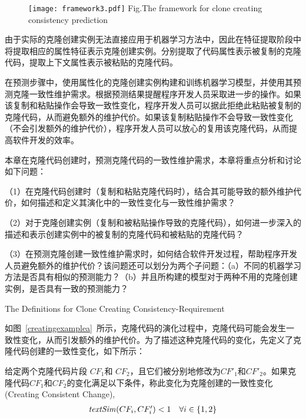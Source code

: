 \begin{figure}[htbp]
\centering
\texttt{[image: framework3.pdf]}
{Fig.$\!$}{The framework for clone creating consistency prediction}
\vspace{-1em}
\end{figure}

由于实际的克隆创建实例无法直接应用于机器学习方法中，因此在特征提取阶段中将提取相应的属性特征表示克隆创建实例。分别提取了代码属性表示被复制的克隆代码，提取上下文属性表示被粘贴的克隆代码。

在预测步骤中，使用属性化的克隆创建实例构建和训练机器学习模型，并使用其预测克隆一致性维护需求。根据预测结果提醒程序开发人员采取进一步的操作。如果该复制和粘贴操作会导致一致性变化，程序开发人员可以据此拒绝此粘贴被复制的克隆代码，从而避免额外的维护代价。如果该复制粘贴操作不会导致一致性变化（不会引发额外的维护代价），程序开发人员可以放心的复用该克隆代码，从而提高软件开发的效率。

本章在克隆代码创建时，预测克隆代码的一致性维护需求，本章将重点分析和讨论如下问题：

（1）在克隆代码创建时（复制和粘贴克隆代码时），结合其可能导致的额外维护代价，如何描述和定义其演化中的一致性变化与一致性维护需求？

（2）对于克隆创建实例（复制和被粘贴操作导致的克隆代码），如何进一步深入的描述和表示创建实例中的被复制的克隆代码和被粘贴的克隆代码？

（3）在预测克隆创建一致性维护需求时，如何结合软件开发过程，帮助程序开发人员避免额外的维护代价？该问题还可以划分为两个子问题：（a）不同的机器学习方法是否具有相似的预测能力？（b）并且所构建的模型对于两种不用的克隆创建实例，是否具有一致的预测能力？


{The Definitions for Clone Creating Consistency-Requirement}

如图~\ref{creatingexamplea}~所示，克隆代码的演化过程中，克隆代码可能会发生一致性变化，从而引发额外的维护代价。为了描述这种克隆代码的变化，先定义了克隆代码创建的一致性变化，如下所示：

\begin{definition}[克隆创建一致性变化]  
\label{def-creatingchange}
给定两个克隆代码片段 $CF_1$和 $CF_2$，且它们被分别地修改为$CF'_1$和$CF'_2$。如果克隆代码$CF_1$和$CF_2$的变化满足以下条件，称此变化为克隆创建的一致性变化(Creating Consistent Change), 
  \[
  \begin{array}[t]{cr}
    \mathit{textSim}(CF_i, CF'_i) < 1 & \forall i \in \{1,2\}  \\
  \end{array}
  \]
\end{definition}


